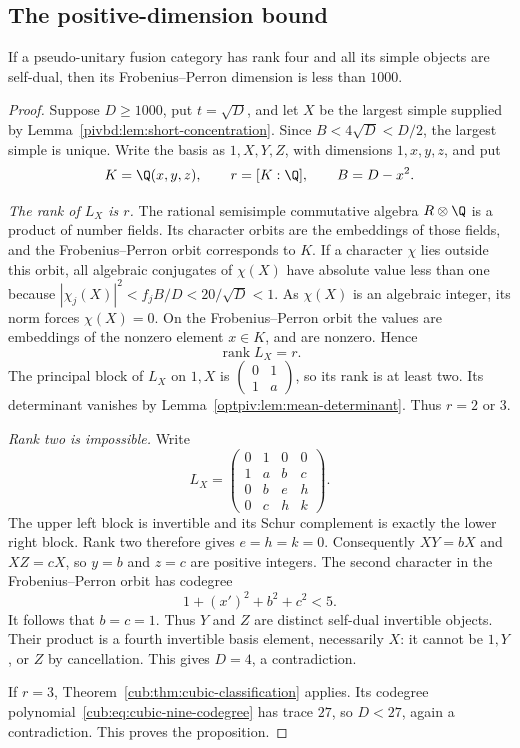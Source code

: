 \subsection{The positive-dimension bound}

\begin{proposition}\label{pivbd:prop:pu}
If a pseudo-unitary fusion category has rank four and all its simple objects are self-dual, then its Frobenius--Perron dimension is less than $1000$.
\end{proposition}
\begin{proof}
Suppose $D\geq1000$, put $t=\sqrt D$, and let $X$ be the largest simple supplied by Lemma~\ref{pivbd:lem:short-concentration}. Since $B<4\sqrt D<D/2$, the largest simple is unique. Write the basis as $1,X,Y,Z$, with dimensions $1,x,y,z$, and put
\[
 K=\Q(x,y,z),\qquad r=[K:\Q],\qquad B=D-x^2.
\]

\smallskip\noindent
\emph{The rank of $L_X$ is $r$.}
The rational semisimple commutative algebra $R\otimes\Q$ is a product of number fields. Its character orbits are the embeddings of those fields, and the Frobenius--Perron orbit corresponds to $K$. If a character $\chi$ lies outside this orbit, all algebraic conjugates of $\chi(X)$ have absolute value less than one because $|\chi_j(X)|^2<f_jB/D<20/\sqrt D<1$. As $\chi(X)$ is an algebraic integer, its norm forces $\chi(X)=0$. On the Frobenius--Perron orbit the values are embeddings of the nonzero element $x\in K$, and are nonzero. Hence
\begin{equation}\label{pivbd:eq:rank-degree}
 \operatorname{rank} L_X=r.
\end{equation}
The principal block of $L_X$ on $1,X$ is
$\left(\begin{smallmatrix}0&1\\1&a\end{smallmatrix}\right)$, so its rank is at least two. Its determinant vanishes by Lemma~\ref{optpiv:lem:mean-determinant}. Thus $r=2$ or $3$.

\smallskip\noindent
\emph{Rank two is impossible.}
Write
\[
 L_X=\begin{pmatrix}
 0&1&0&0\\
 1&a&b&c\\
 0&b&e&h\\
 0&c&h&k
 \end{pmatrix}.
\]
The upper left block is invertible and its Schur complement is exactly the lower right block. Rank two therefore gives $e=h=k=0$. Consequently $XY=bX$ and $XZ=cX$, so $y=b$ and $z=c$ are positive integers. The second character in the Frobenius--Perron orbit has codegree
\[
 1+(x')^2+b^2+c^2<5.
\]
It follows that $b=c=1$. Thus $Y$ and $Z$ are distinct self-dual invertible objects. Their product is a fourth invertible basis element, necessarily $X$: it cannot be $1,Y$, or $Z$ by cancellation. This gives $D=4$, a contradiction.


If $r=3$, Theorem~\ref{cub:thm:cubic-classification} applies. Its
codegree polynomial~\eqref{cub:eq:cubic-nine-codegree} has trace $27$,
so $D<27$, again a contradiction. This proves the proposition.
\end{proof}
